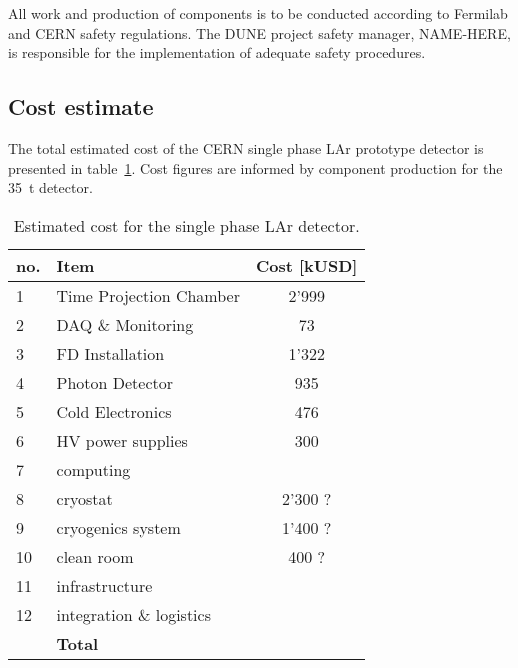 All work and production of components is to be conducted according to Fermilab and CERN safety regulations. The DUNE project safety 
manager, NAME-HERE, is responsible for the implementation of adequate safety procedures.

\subsection{Cost estimate}
The total estimated cost of the CERN single phase LAr prototype detector is presented in table~\ref{tab:cost}.
Cost figures are informed by component production for the 35~t detector.

\begin{table}[h!]
\centering
\begin{tabular}{| l| l| c |}
\hline
\textbf{no. } & \textbf{Item}  & \textbf{Cost [kUSD]}  \\ \hline
1 & Time Projection Chamber & 2'999 \\
2 & DAQ \& Monitoring  & 73 \\
3 & FD Installation  & 1'322 \\
4 & Photon Detector  & 935 \\
5 & Cold Electronics & 476 \\
6 & HV power supplies & 300\\

7 & computing & \\
8 & cryostat &  2'300 ?\\   %
9 & cryogenics system & 1'400 ? \\  %
10 & clean room & 400 ? \\
11 & infrastructure & \\
12 & integration \& logistics & \\ \hline
  & \textbf{Total } & \\ \hline
\end{tabular}
\caption{Estimated cost for the single phase LAr detector.}
\label{tab:cost}
\end{table}




